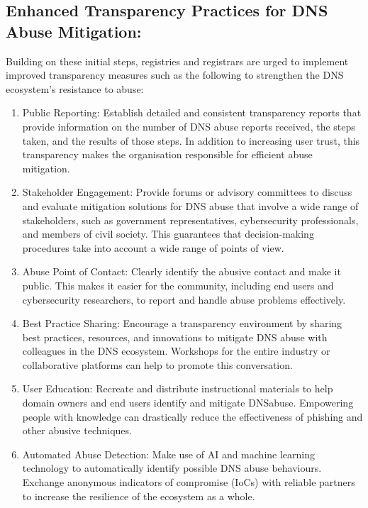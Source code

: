 \subsection{Enhanced Transparency Practices for DNS Abuse Mitigation: }

Building on these initial steps, registries and registrars are urged to implement improved transparency measures such as the following to strengthen the DNS ecosystem's resistance to abuse:

\begin{enumerate}
    \item Public Reporting: Establish detailed and consistent transparency reports that provide information on the number of DNS abuse reports received, the steps taken, and the results of those steps. In addition to increasing user trust, this transparency makes the organisation responsible for efficient abuse mitigation.

    \item Stakeholder Engagement: Provide forums or advisory committees to discuss and evaluate mitigation solutions for DNS abuse that involve a wide range of stakeholders, such as government representatives, cybersecurity professionals, and members of civil society. This guarantees that decision-making procedures take into account a wide range of points of view.

    \item Abuse Point of Contact: Clearly identify the abusive contact and make it public. This makes it easier for the community, including end users and cybersecurity researchers, to report and handle abuse problems effectively.

    \item Best Practice Sharing: Encourage a transparency environment by sharing best practices, resources, and innovations to mitigate DNS abuse with colleagues in the DNS ecosystem. Workshops for the entire industry or collaborative platforms can help to promote this conversation.

    \item User Education: Recreate and distribute instructional materials to help domain owners and end users identify and mitigate DNSabuse. Empowering people with knowledge can drastically reduce the effectiveness of phishing and other abusive techniques.

    \item Automated Abuse Detection: Make use of AI and machine learning technology to automatically identify possible DNS abuse behaviours. Exchange anonymous indicators of compromise (IoCs) with reliable partners to increase the resilience of the ecosystem as a whole.

\end{enumerate}


